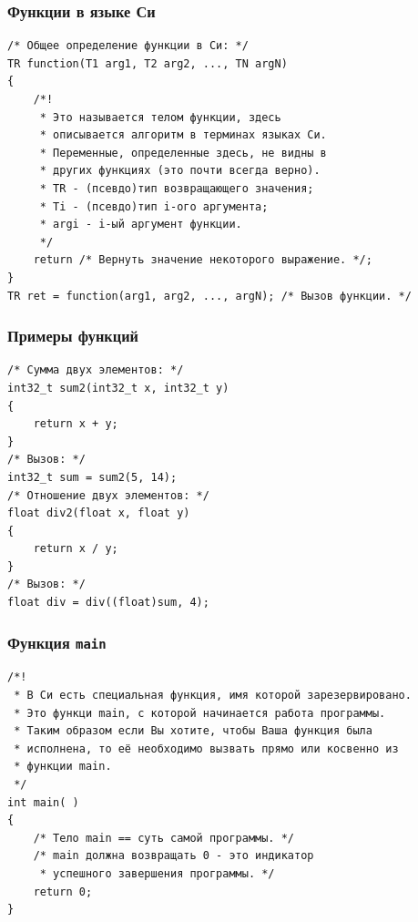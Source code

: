 \documentclass{beamer}
\begin{document}
    \begin{frame}[fragile]
        \frametitle{Функции в языке Си}
        \begin{verbatim}
/* Общее определение функции в Си: */
TR function(T1 arg1, T2 arg2, ..., TN argN)
{
    /*!
     * Это называется телом функции, здесь 
     * описывается алгоритм в терминах языках Си.
     * Переменные, определенные здесь, не видны в 
     * других функциях (это почти всегда верно).
     * TR - (псевдо)тип возвращающего значения;
     * Ti - (псевдо)тип i-ого аргумента;
     * argi - i-ый аргумент функции.
     */
    return /* Вернуть значение некоторого выражение. */;
}
TR ret = function(arg1, arg2, ..., argN); /* Вызов функции. */
        \end{verbatim}
    \end{frame}
    \begin{frame}[fragile]
        \frametitle{Примеры функций}
        \begin{verbatim}
/* Сумма двух элементов: */
int32_t sum2(int32_t x, int32_t y)
{
    return x + y;
}
/* Вызов: */
int32_t sum = sum2(5, 14);
/* Отношение двух элементов: */
float div2(float x, float y)
{
    return x / y;
}
/* Вызов: */
float div = div((float)sum, 4);
        \end{verbatim}
    \end{frame}
    \begin{frame}[fragile]
        \frametitle{Функция \texttt{main}}
        \begin{verbatim}
/*!
 * В Си есть специальная функция, имя которой зарезервировано.
 * Это функци main, с которой начинается работа программы.
 * Таким образом если Вы хотите, чтобы Ваша функция была 
 * исполнена, то её необходимо вызвать прямо или косвенно из 
 * функции main.
 */
int main( )
{
    /* Тело main == cуть самой программы. */
    /* main должна возвращать 0 - это индикатор 
     * успешного завершения программы. */
    return 0; 
}
        \end{verbatim}
    \end{frame}
\end{document}
